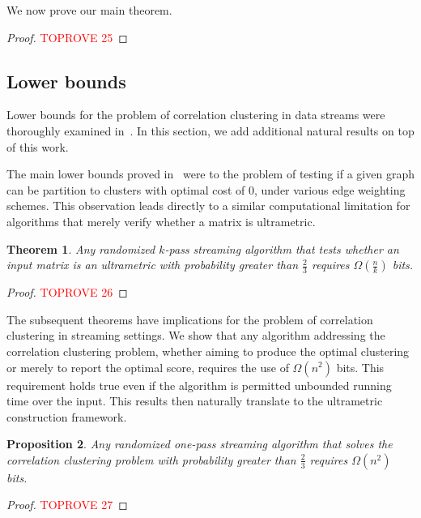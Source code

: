 \documentclass{article}
\newtheorem{theorem}{Theorem}
\newtheorem{proposition}[theorem]{Proposition}
\begin{document}
We now prove our main theorem.
\lzerofit*
\begin{proof}\textcolor{red}{TOPROVE 25}\end{proof}

\subsection{Lower bounds} \label{section:LowerBounds}

Lower bounds for the problem of correlation clustering in data streams were thoroughly examined in~\cite{ahn2021correlation}. In this section, we add additional natural results on top of this work.

The main lower bounds proved in~\cite{ahn2021correlation} were to the problem of testing if a given graph can be partition to clusters with optimal cost of $0$, under various edge weighting schemes. This observation leads directly to a similar computational limitation for algorithms that merely verify whether a matrix is ultrametric.
                          
\begin{theorem}
    Any randomized $k$-pass streaming algorithm that tests whether an input matrix is an ultrametric with probability greater than $\frac{2}{3}$ requires $\Omega(\frac{n}{k})$ bits.
\end{theorem}

\begin{proof}\textcolor{red}{TOPROVE 26}\end{proof}

The subsequent theorems have implications for the problem of correlation clustering in streaming settings. We show that any algorithm addressing the correlation clustering problem, whether aiming to produce the optimal clustering or merely to report the optimal score, requires the use of $\Omega (n^2)$ bits. This requirement holds true even if the algorithm is permitted unbounded running time over the input. This results then naturally translate to the ultrametric construction framework.

\begin{proposition}\label{proposition:lbzeroclustering}
    Any randomized one-pass streaming algorithm that solves the correlation clustering problem with probability greater than $\frac{2}{3}$ requires $\Omega(n^2)$ bits.
\end{proposition}

\begin{proof}\textcolor{red}{TOPROVE 27}\end{proof}
\end{document}
